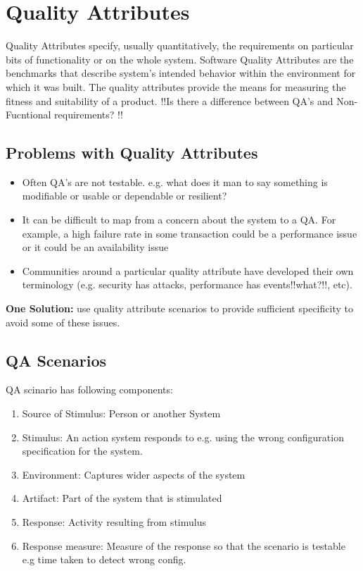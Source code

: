\documentclass[a4paper]{report}
\begin{document}
\section{Quality Attributes}
Quality Attributes specify, usually quantitatively, the requirements on particular bits of functionality or on the whole system. 
Software Quality Attributes are the benchmarks that describe system’s intended behavior within the environment for which it was built. The quality attributes provide the means for measuring the fitness and suitability of a product.
!!Is there a difference between QA's and Non-Fucntional requirements? !!

\subsection{Problems with Quality Attributes}
\begin{itemize}
\item Often QA's are not testable. e.g. what does it man to say something is modifiable or usable or dependable or resilient?
\item It can be difficult to map from a concern about the system to a QA. For example, a high failure rate in some transaction could be a performance issue or it could be an availability issue
\item Communities around a particular quality attribute have developed their own terminology (e.g. security has attacks, performance has events!!what?!!, etc).
\end{itemize}

\textbf{One Solution: } use quality attribute scenarios to provide sufficient specificity to avoid some of these issues.

\subsection{QA Scenarios}
QA scinario has following components:
\begin{enumerate}
\item Source of Stimulus: Person or another System
\item Stimulus: An action system responds to e.g. using the wrong configuration specification for the system.
\item Environment: Captures wider aspects of the system
\item Artifact: Part of the system that is stimulated
\item Response: Activity resulting from stimulus
\item Response measure: Measure of the response so that the scenario is testable e.g time taken to detect wrong config.
\end{enumerate}
\end{document}
